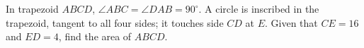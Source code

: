 In trapezoid $ABCD$, $\angle ABC=\angle DAB=90^\circ$. A circle is inscribed in the trapezoid, tangent to all four sides; it touches side $CD$ at $E$. Given that $CE=16$ and $ED=4$, find the area of $ABCD$.
